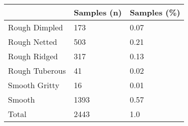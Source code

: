 \begin{tabular}{lll}
\toprule
{} & Samples (n) & Samples (\%) \\
\midrule
Rough Dimpled  &         173 &        0.07 \\
Rough Netted   &         503 &        0.21 \\
Rough Ridged   &         317 &        0.13 \\
Rough Tuberous &          41 &        0.02 \\
Smooth Gritty  &          16 &        0.01 \\
Smooth         &        1393 &        0.57 \\
Total          &        2443 &         1.0 \\
\bottomrule
\end{tabular}
